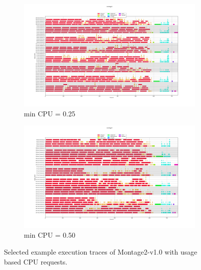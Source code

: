 \begin{figure}[H]
\begin{subfigure}{1.0\textwidth}
\centering
\includegraphics[width=1\linewidth]{figures/6-3-m1.0-optimal-cpu-0.25.png}
\caption[Selected example execution trace of Montage2-v1.0 with usage based CPU requests, min 0.25]{min CPU = 0.25}
\label{fig:evaluation:res-util:m10:025}
\end{subfigure}
\begin{subfigure}{1.0\textwidth}
\centering
\includegraphics[width=1\linewidth]{figures/6-3-m1.0-optimal-cpu-0.50.png}
\caption[Selected example execution trace of Montage2-v1.0 with usage based CPU requests, min 0.50]{min CPU = 0.50}
\label{fig:evaluation:res-util:m10:050}
\end{subfigure}
\centering
\caption[Selected example execution traces of Montage2-v1.0 with usage based CPU requests]{Selected example execution traces of Montage2-v1.0 with usage based CPU requests.}
\label{fig:evaluation:res-util:m10:plugin}
\end{figure}



